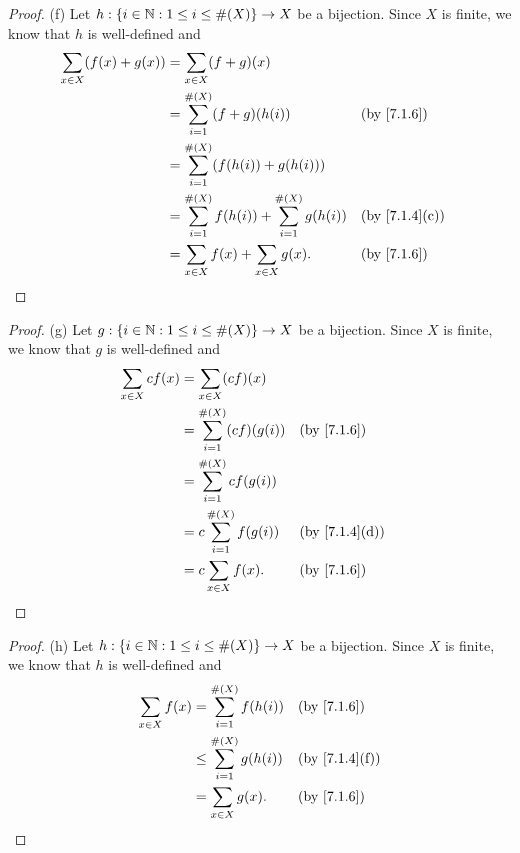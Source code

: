 \begin{proof}{(f)}
  Let \(h : \left\lbrace i \in \mathbb{N} : 1 \leq i \leq \#(X)\right\rbrace \to X\) be a bijection.
  Since \(X\) is finite, we know that \(h\) is well-defined and
  \begin{align*}
    \sum_{x \in X} (f(x) + g(x)) & = \sum_{x \in X} (f + g)(x)                                                      \\
                                 & = \sum_{i = 1}^{\#(X)} (f + g)(h(i))                          &  & \by{7.1.6}    \\
                                 & = \sum_{i = 1}^{\#(X)} (f(h(i)) + g(h(i)))                                       \\
                                 & = \sum_{i = 1}^{\#(X)} f(h(i)) + \sum_{i = 1}^{\#(X)} g(h(i)) &  & \by{7.1.4}[c] \\
                                 & = \sum_{x \in X} f(x) + \sum_{x \in X} g(x).                  &  & \by{7.1.6}
  \end{align*}
\end{proof}

\begin{proof}{(g)}
  Let \(g : \left\lbrace i \in \mathbb{N} : 1 \leq i \leq \#(X)\right\rbrace \to X\) be a bijection.
  Since \(X\) is finite, we know that \(g\) is well-defined and
  \begin{align*}
    \sum_{x \in X} cf(x) & = \sum_{x \in X} (cf)(x)                             \\
                         & = \sum_{i = 1}^{\#(X)} (cf)(g(i)) &  & \by{7.1.6}    \\
                         & = \sum_{i = 1}^{\#(X)} cf(g(i))                      \\
                         & = c \sum_{i = 1}^{\#(X)} f(g(i))  &  & \by{7.1.4}[d] \\
                         & = c \sum_{x \in X} f(x).          &  & \by{7.1.6}
  \end{align*}
\end{proof}

\begin{proof}{(h)}
  Let \(h : \left\lbrace i \in \mathbb{N} : 1 \leq i \leq \#(X)\right\rbrace \to X\) be a bijection.
  Since \(X\) is finite, we know that \(h\) is well-defined and
  \begin{align*}
    \sum_{x \in X} f(x) & = \sum_{i = 1}^{\#(X)} f(h(i))    &  & \by{7.1.6}    \\
                        & \leq \sum_{i = 1}^{\#(X)} g(h(i)) &  & \by{7.1.4}[f] \\
                        & = \sum_{x \in X} g(x).            &  & \by{7.1.6}
  \end{align*}
\end{proof}

